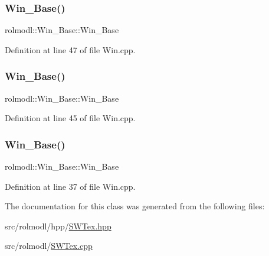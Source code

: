 \subsubsection{\texorpdfstring{Win\_Base()}{Win\_Base()}\hspace{0.1cm}{\footnotesize\ttfamily [4/6]}}
{\footnotesize\ttfamily rolmodl\+::\+Win\+\_\+\+Base\+::\+Win\+\_\+\+Base}



Definition at line 47 of file Win.\+cpp.

\mbox{\label{classrolmodl_1_1_win___s_w_aaa9e04d7aa993555afbdf34ab3fd92f0}} 
\subsubsection{\texorpdfstring{Win\_Base()}{Win\_Base()}\hspace{0.1cm}{\footnotesize\ttfamily [5/6]}}
{\footnotesize\ttfamily rolmodl\+::\+Win\+\_\+\+Base\+::\+Win\+\_\+\+Base}



Definition at line 45 of file Win.\+cpp.

\mbox{\label{classrolmodl_1_1_win___s_w_a3ff14fcd3028c11faaaa4dc2b70de9ac}} 
\subsubsection{\texorpdfstring{Win\_Base()}{Win\_Base()}\hspace{0.1cm}{\footnotesize\ttfamily [6/6]}}
{\footnotesize\ttfamily rolmodl\+::\+Win\+\_\+\+Base\+::\+Win\+\_\+\+Base}



Definition at line 37 of file Win.\+cpp.



The documentation for this class was generated from the following files\+:\begin{DoxyCompactItemize}
\item 
src/rolmodl/hpp/\mbox{\hyperlink{_s_w_tex_8hpp}{S\+W\+Tex.\+hpp}}\item 
src/rolmodl/\mbox{\hyperlink{_s_w_tex_8cpp}{S\+W\+Tex.\+cpp}}\end{DoxyCompactItemize}
